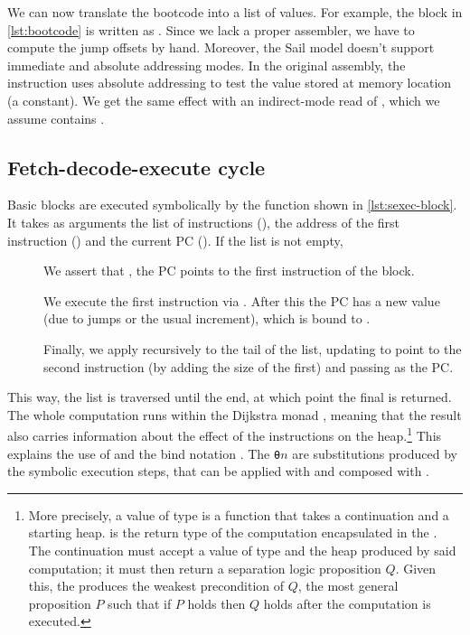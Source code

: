 We can now translate the bootcode into a list of  values. For example, the  block in \cref{lst:bootcode} is written as . Since we lack a proper assembler, we have to compute the jump offsets by hand. Moreover, the Sail model doesn't support immediate and absolute addressing modes. In the original assembly, the  instruction uses absolute addressing to test the value stored at memory location  (a constant). We get the same effect with an indirect-mode read of , which we assume contains .

\subsection{Fetch-decode-execute cycle}

Basic blocks are executed symbolically by the  function shown in \cref{lst:sexec-block}. It takes as arguments the list of instructions (), the address of the first instruction () and the current PC (). If the list is not empty,
\begin{description}
\item[] We assert that , \ie the PC points to the first instruction of the block.
\item[] We execute the first instruction via . After this the PC has a new value (due to jumps or the usual increment), which is bound to .
\item[] Finally, we apply  recursively to the tail of the list, updating  to point to the second instruction (by adding the size of the first) and passing  as the PC.
\end{description}

This way, the list is traversed until the end, at which point the final  is returned. The whole computation runs within the Dijkstra monad  \cite{Keuchel2022}, meaning that the result also carries information about the effect of the instructions on the heap.\footnote{More precisely, a value of type  is a function that takes a continuation and a starting heap.  is the return type of the computation encapsulated in the . The continuation must accept a value of type  and the heap produced by said computation; it must then return a separation logic proposition \(Q\). Given this, the  produces the weakest precondition of \(Q\), \ie the most general proposition \(P\) such that if \(P\) holds then \(Q\) holds after the computation is executed.} This explains the use of  and the bind notation . The \texttt{θ}\(n\) are substitutions produced by the symbolic execution steps, that can be applied with  and composed with .

